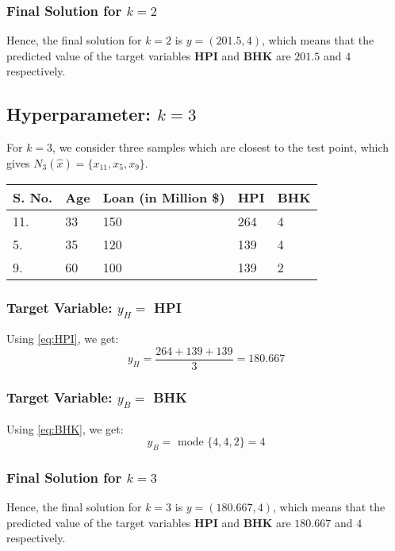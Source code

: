 \documentclass[12pt]{article}
\newcommand{\HPI}{\subsubsection*{Target Variable: $y_{H} =$ HPI}}
\newcommand{\BHK}{\subsubsection*{Target Variable: $y_{B} =$ BHK}}
\newcommand{\setk}[1]{\subsection*{Hyperparameter: $k = #1$}}
\newcommand{\solution}[3]{
    \subsubsection*{Final Solution for $k = #1$}
    Hence, the final solution for $k = #1$ is $y = (#2, #3)$, which means that the predicted value
    of the target variables \textbf{HPI} and \textbf{BHK} are $#2$ and $#3$ respectively.
}
\begin{document}
    \solution{2}{201.5}{4}

    \setk{3}
    For $k = 3$, we consider three samples which are closest to the test point, which gives $N_{3}(\hat{x}) = \{ x_{11}, x_{5}, x_{9} \}$.

    \begin{center}
        \begin{tabular}{| m{15mm} | m{30mm} | m{50mm} | m{20mm} | m{20mm} |}
            \hline
            \textbf{S. No.} & \textbf{Age} & \textbf{Loan (in Million \$)} & \textbf{HPI} & \textbf{BHK} \\
            \hline
            \hline 11. & 33 & 150 & 264 & 4 \\
            \hline 5. & 35 & 120 & 139 & 4 \\
            \hline 9. & 60 & 100 & 139 & 2 \\
            \hline
        \end{tabular}
    \end{center}

    \HPI
    Using \eqref{eq:HPI}, we get:
    \begin{equation}
        y_{H} = \frac{264 + 139 + 139}{3} = 180.667
    \end{equation}

    \BHK
    Using \eqref{eq:BHK}, we get:
    \begin{equation}
        y_{B} = \text{ mode } \{4, 4, 2 \} = 4
    \end{equation}

    \solution{3}{180.667}{4}
\end{document}
